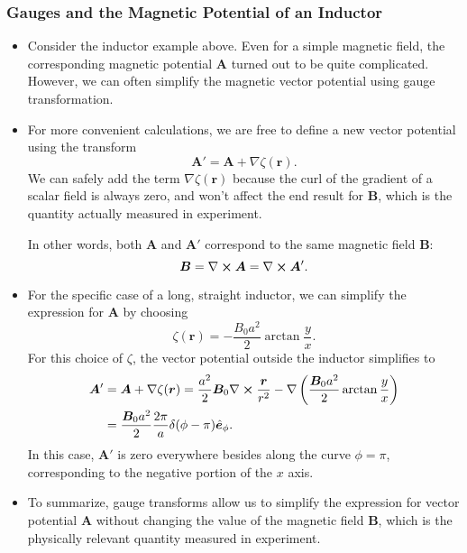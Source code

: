 \documentclass[11pt, a4paper]{article}
\renewcommand{\vec}[1]{\bm{#1}} %
\newcommand{\uvec}[1]{\hat{\vec{#1}}} %
\renewcommand{\r}{\vec{r}}
\newcommand{\B}{\vec{B}} %
\newcommand{\A}{\vec{A}} %
\renewcommand{\curl}{\nabla \cross}
\renewcommand{\grad}{\nabla}
\begin{document}
\subsubsection{Gauges and the Magnetic Potential of an Inductor}
\begin{itemize}
	\item Consider the inductor example above. Even for a simple magnetic field, the corresponding magnetic potential $ \A $ turned out to be quite complicated. However, we can often simplify the magnetic vector potential using gauge transformation. 
	
	
	\item For more convenient calculations, we are free to define a new vector potential using the transform
	\begin{equation*}
		\A' = \A + \grad \zeta (\r).
	\end{equation*}
	We can safely add the term $ \grad \zeta (\r) $ because the curl of the gradient of a scalar field is always zero, and won't affect the end result for $ \B $, which is the quantity actually measured in experiment.

    In other words, both $ \A $ and $ \A' $ correspond to the same magnetic field $ \B $:
	\begin{equation*}
		\B = \curl \A = \curl \A'.
	\end{equation*}
	
	\item For the specific case of a long, straight inductor, we can simplify the expression for $ \A $ by choosing
	\begin{equation*}
		\zeta (\r)  = -\frac{B_{0}a^{2}}{2} \arctan \frac{y}{x}.
	\end{equation*}
	For this choice of $ \zeta $, the vector potential outside the inductor simplifies to
	\begin{align*}
		\A' &= \A + \grad \zeta (\r) = \frac{a^{2}}{2}\B_{0}\curl \frac{\r}{r^{2}} - \grad \left(\frac{\B_{0}a^{2}}{2} \arctan \frac{y}{x}\right)\\
		& = \frac{\B_{0}a^{2}}{2} \frac{2\pi}{a} \delta (\phi - \pi) \uvec{e}_{\phi}.
	\end{align*}
	In this case, $ \A' $ is zero everywhere besides along the curve $ \phi = \pi $, corresponding to the negative portion of the $ x $ axis.
	
	\item To summarize, gauge transforms allow us to simplify the expression for vector potential $ \A $ without changing the value of the magnetic field $ \B $, which is the physically relevant quantity measured in experiment.
\end{itemize}
\end{document}
